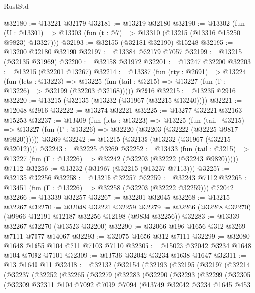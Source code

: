 \begin{lexlean}{RustStd}
\begin{coremodule}
@32180 := @13221 @32179
@32181 := @13219 @32180
@32190 := @13302
    (fun (U : @13301) => @13303 (fun (t : @7) => @13310 (@13215 (@13316 @15250 @9823) @13327)))
@32193 := @32155 (@32181 @32190) @15248
@32195 := @13200 @32180 @32190
@32197 := @13384 @32179 @7057
@32199 := @13215 (@32135 @31969)
@32200 := @32158 @31972
@32201 := @13247 @32200
@32203 := @13215 (@32201 @13267)
@32214 := @13387
    (fun (rty : @2691) =>
    @13224
      (fun (lets : @13223) =>
      @13225 (fun (tail : @3215) => @13227 (fun (Γ : @13226) => @32199 (@32203 @32168)))))
    @2916
@32215 := @13235 @2916
@32220 := @13215 (@32135 (@13232 (@31967 (@32215 @13240))))
@32221 := @12048 @2916
@32222 := @13274 @32221
@32225 := @13277 @32221 @32163 @15253
@32237 := @13409
    (fun (lets : @13223) =>
    @13225
      (fun (tail : @3215) =>
      @13227 (fun (Γ : @13226) => @32220 (@32203 (@32222 (@32225 @9817 @9820))))))
    @3269
@32242 := @13215 (@32135 (@13232 (@31967 (@32215 @32012))))
@32243 := @32225 @3269
@32252 := @13433
    (fun (tail : @3215) => @13227 (fun (Γ : @13226) => @32242 (@32203 (@32222 (@32243 @9820)))))
    @7112
@32256 := @13232 (@31967 (@32215 (@13237 @7113)))
@32257 := @32135 @32256
@32258 := @13215 @32257
@32259 := @32243 @7112
@32265 := @13451 (fun (Γ : @13226) => @32258 (@32203 (@32222 @32259))) @32042
@32266 := @13339 @32257
@32267 := @32201 @32045
@32268 := @13215 @32267
@32270 := @32048 @32221 @32259
@32279 := @32266 (@32268 @32270) (@9966 @12191 @12187 @32256 @12198 (@9834 @32256))
@32283 := @13339 @32267 @32270 (@13523 @32200)
@32290 := @32066 @196 @1656 @312 @3269 @7111 @7077 @14067
@32293 := @32075 @1656 @312 @7111
@32299 := @32080 @1648 @1655 @104 @311 @7103 @7110
@32305 := @15023 @32042 @3234 @1648 @104 @7092 @7101
@32309 := @13736 @32042 @3234 @1638 @1647
@32311 := @13 @1640 @11
@32418 := @32132
    (@32154
      (@32193
        (@32195
          (@32197
            (@32214
              (@32237
                (@32252
                  (@32265
                    (@32279
                      (@32283
                        (@32290
                          (@32293
                            (@32299
                              (@32305
                                (@32309
                                  @32311
                                  @104
                                  @7092
                                  @7099
                                  @7094
                                  (@13749
                                    @32042
                                    @3234
                                    @1645
                                    @453

\end{coremodule}
\end{lexlean}
